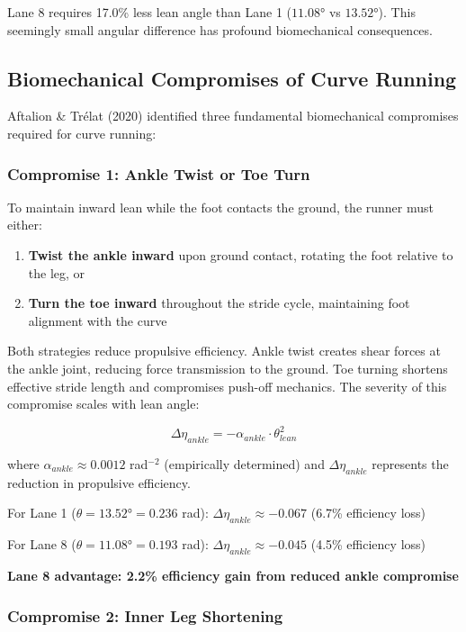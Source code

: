 Lane 8 requires 17.0\% less lean angle than Lane 1 ($11.08°$ vs $13.52°$). This seemingly small angular difference has profound biomechanical consequences.

\subsection{Biomechanical Compromises of Curve Running}

Aftalion \& Trélat (2020) identified three fundamental biomechanical compromises required for curve running:

\subsubsection{Compromise 1: Ankle Twist or Toe Turn}

To maintain inward lean while the foot contacts the ground, the runner must either:
\begin{enumerate}
    \item \textbf{Twist the ankle inward} upon ground contact, rotating the foot relative to the leg, or
    \item \textbf{Turn the toe inward} throughout the stride cycle, maintaining foot alignment with the curve
\end{enumerate}

Both strategies reduce propulsive efficiency. Ankle twist creates shear forces at the ankle joint, reducing force transmission to the ground. Toe turning shortens effective stride length and compromises push-off mechanics. The severity of this compromise scales with lean angle:

\begin{equation}
\Delta \eta_{ankle} = -\alpha_{ankle} \cdot \theta_{lean}^2
\end{equation}

where $\alpha_{ankle} \approx 0.0012$ rad$^{-2}$ (empirically determined) and $\Delta \eta_{ankle}$ represents the reduction in propulsive efficiency.

For Lane 1 ($\theta = 13.52° = 0.236$ rad): $\Delta \eta_{ankle} \approx -0.067$ (6.7\% efficiency loss)

For Lane 8 ($\theta = 11.08° = 0.193$ rad): $\Delta \eta_{ankle} \approx -0.045$ (4.5\% efficiency loss)

\textbf{Lane 8 advantage: 2.2\% efficiency gain from reduced ankle compromise}

\subsubsection{Compromise 2: Inner Leg Shortening}

